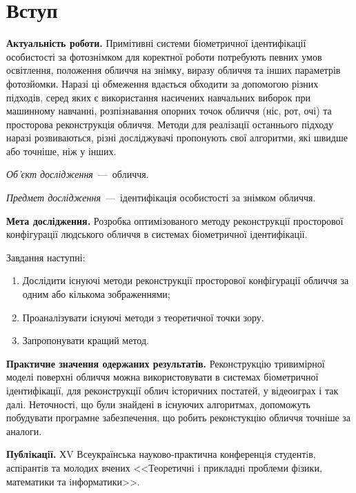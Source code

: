 \chapter*{Вступ}

\textbf{Актуальність роботи.}
Примітивні системи біометричної ідентифікації особистості за фотознімком
для коректної роботи потребують певних умов
освітлення, положення обличчя на знімку, виразу обличчя
та інших параметрів фотозйомки.
Наразі ці обмеження вдається обходити за допомогою різних підходів,
серед яких є
використання насичених навчальних виборок при машинному навчанні,
розпізнавання опорних точок обличчя (ніс, рот, очі)
та просторова реконструкція обличчя.
Методи для реалізації останнього підходу наразі розвиваються,
різні досліджувачі пропонують свої алгоритми,
які швидше або точніше, ніж у інших.

\textit{Об’єкт дослідження}~---~обличчя.

\textit{Предмет дослідження}~---~ідентифікація особистості за знімком обличчя.

\textbf{Мета дослідження.}
Розробка оптимізованого методу реконструкції просторової конфігурації
людського обличчя в системах біометричної ідентифікації.

Завдання наступні:
\begin{enumerate}
  \item
    Дослідити існуючі методи реконструкції просторової конфігурації обличчя
    за одним або кількома зображеннями;
  \item
    Проаналізувати існуючі методи з теоретичної точки зору.
  \item
    Запропонувати кращий метод.
\end{enumerate}

\textbf{Практичне значення одержаних результатів.}
Реконструкцію тривимірної моделі поверхні обличчя
можна використовувати в системах біометричної ідентифікації,
для реконструкції облич історичних постатей,
у відеоиграх і так далі.
Неточності, що були знайдені в існуючих алгоритмах,
допоможуть побудувати програмне забезпечення,
що робить реконстукцію обличчя точніше за аналоги.

\textbf{Публiкацiї.}
ХV Всеукраїнська науково-практична конференцiя студентiв,
аспiрантiв та молодих вчених
<<Теоретичнi i прикладнi проблеми фiзики, математики та iнформатики>>.
